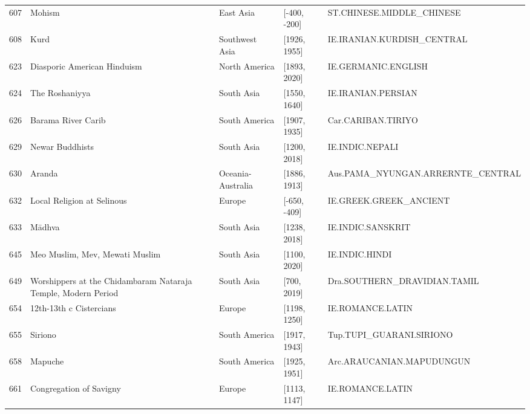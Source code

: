 {\begin{longtable}{rp{3.5cm}llp{3.5cm}}
607 & {\raggedright Mohism} & East Asia & [-400, -200] & {\raggedright ST.\allowbreak{}CHINESE.\allowbreak{}MIDDLE\_\allowbreak{}CHINESE} \\
608 & {\raggedright Kurd} & Southwest Asia & [1926, 1955] & {\raggedright IE.\allowbreak{}IRANIAN.\allowbreak{}KURDISH\_\allowbreak{}CENTRAL} \\
623 & {\raggedright Diasporic American Hinduism} & North America & [1893, 2020] & {\raggedright IE.\allowbreak{}GERMANIC.\allowbreak{}ENGLISH} \\
624 & {\raggedright The Roshaniyya} & South Asia & [1550, 1640] & {\raggedright IE.\allowbreak{}IRANIAN.\allowbreak{}PERSIAN} \\
626 & {\raggedright Barama River Carib} & South America & [1907, 1935] & {\raggedright Car.\allowbreak{}CARIBAN.\allowbreak{}TIRIYO} \\
629 & {\raggedright Newar Buddhists} & South Asia & [1200, 2018] & {\raggedright IE.\allowbreak{}INDIC.\allowbreak{}NEPALI} \\
630 & {\raggedright Aranda} & Oceania-Australia & [1886, 1913] & {\raggedright Aus.\allowbreak{}PAMA\_\allowbreak{}NYUNGAN.\allowbreak{}ARRERNTE\_\allowbreak{}CENTRAL} \\
632 & {\raggedright Local Religion at Selinous} & Europe & [-650, -409] & {\raggedright IE.\allowbreak{}GREEK.\allowbreak{}GREEK\_\allowbreak{}ANCIENT} \\
633 & {\raggedright Mādhva} & South Asia & [1238, 2018] & {\raggedright IE.\allowbreak{}INDIC.\allowbreak{}SANSKRIT} \\
645 & {\raggedright Meo Muslim, Mev, Mewati Muslim} & South Asia & [1100, 2020] & {\raggedright IE.\allowbreak{}INDIC.\allowbreak{}HINDI} \\
649 & {\raggedright Worshippers at the Chidambaram Nataraja Temple, Modern Period} & South Asia & [700, 2019] & {\raggedright Dra.\allowbreak{}SOUTHERN\_\allowbreak{}DRAVIDIAN.\allowbreak{}TAMIL} \\
654 & {\raggedright 12th-13th c Cistercians} & Europe & [1198, 1250] & {\raggedright IE.\allowbreak{}ROMANCE.\allowbreak{}LATIN} \\
655 & {\raggedright Siriono} & South America & [1917, 1943] & {\raggedright Tup.\allowbreak{}TUPI\_\allowbreak{}GUARANI.\allowbreak{}SIRIONO} \\
658 & {\raggedright Mapuche} & South America & [1925, 1951] & {\raggedright Arc.\allowbreak{}ARAUCANIAN.\allowbreak{}MAPUDUNGUN} \\
661 & {\raggedright Congregation of Savigny} & Europe & [1113, 1147] & {\raggedright IE.\allowbreak{}ROMANCE.\allowbreak{}LATIN} \\

\end{longtable}}
